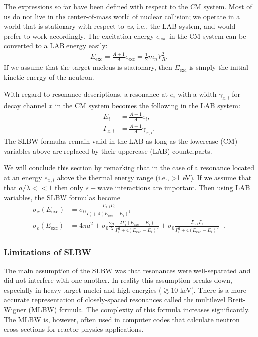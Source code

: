 \documentclass[11pt]{article}
\begin{document}
The expressions so far have been defined with respect to the CM system.  Most of us do not live in the center-of-mass world of nuclear collision; we operate in a world that is stationary with respect to \emph{us}, i.e., the LAB system, and would prefer to work accordingly.  The excitation energy \(e_\text{exc}\) in the CM system can be converted to a LAB energy easily:
\begin{align}
  E_\text{exc} = \frac{A+1}{A}e_\text{exc} = \frac{1}{2} m_n V_R^2.
\end{align}
If we assume that the target nucleus is stationary, then \(E_\text{exc}\) is simply the initial kinetic energy of the neutron.

With regard to resonance descriptions, a resonance at \(e_i\) with a width \(\gamma_{x,i}\) for decay channel \(x\) in the CM system becomes the following in the LAB system:
\begin{align}
  E_i &= \frac{A+1}{A} e_i, \\
  \Gamma_{x,i} &= \frac{A+1}{A} \gamma_{x,i}.
\end{align}
The SLBW formulas remain valid in the LAB as long as the lowercase (CM) variables above are replaced by their uppercase (LAB) counterparts.

We will conclude this section by remarking that in the case of a resonance located at an energy \(e_{x,i}\) above the thermal energy range (i.e., >1 eV).  If we assume that that \(a/\lambda << 1\) then only \(s-\text{wave}\) interactions are important.  Then using LAB variables, the SLBW formulas become
\begin{align}
  \label{eq::simpleSLBW1}
  \sigma_x(E_\text{exc}) &=  \sigma_0 \frac{\Gamma_{x,i} \Gamma_i}{\Gamma_i^2 + 4\left(E_\text{exc} - E_i\right)^2} \\
  \label{eq::simpleSLBW2}
  \sigma_e(E_\text{exc}) &= 4\pi a^2 
         + \sigma_0 \frac{2a}{\lambda} \frac{2\Gamma_i\left(E_\text{exc} - E_i\right)}{\Gamma_i^2 + 4\left(E_\text{exc} - E_i\right)^2}
         + \sigma_0 \frac{\Gamma_{n,i} \Gamma_i}{\Gamma_i^2 + 4\left(E_\text{exc} - E_i\right)^2} \;\;.
\end{align}

\subsubsection{Limitations of SLBW}
\label{sec:orgheadline15}
The main assumption of the SLBW was that resonances were well-separated and did not interfere with one another.  In reality this assumption breaks down, especially in heavy target nuclei and high energies (\(\gtrsim 10\) keV).  There is a more accurate representation of closely-spaced resonances called the multilevel Breit-Wigner (MLBW) formula.  The complexity of this formula increases significantly.  The MLBW is, however, often used in computer codes that calculate neutron cross sections for reactor physics applications.
\end{document}
